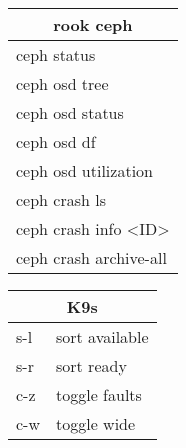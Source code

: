 \documentclass[12pt,paper=landscape,paper=a4]{scrartcl}
\begin{document}
\begin{multicols}{3}
    \vspace{1em}

    \begin{tabular}{l}
        \multicolumn{1}{c}{rook ceph}\\
        \hline
        ceph status\\
        ceph osd tree\\
        ceph osd status\\
        ceph osd df\\
        ceph osd utilization\\
        ceph crash ls\\
        ceph crash info \textless{}ID\textgreater\\
        ceph crash archive-all\\
    \end{tabular}

    \vspace{1em}

    \begin{tabular}{ll}
        \multicolumn{2}{c}{K9s}\\
        \hline
        s-l  & sort available\\
        s-r  & sort ready\\
        c-z  & toggle faults\\
        c-w  & toggle wide\\
    \end{tabular}

    \vspace{1em}


\end{multicols}
\end{document}
